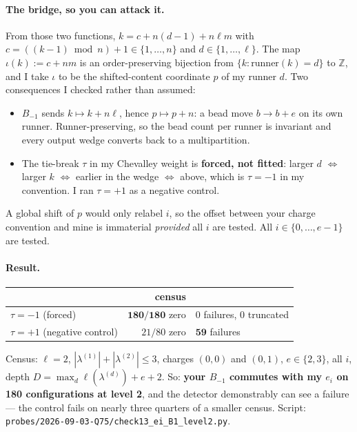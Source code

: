 \documentclass[11pt]{article}
\newcommand{\Z}{\mathbb{Z}}
\begin{document}
\paragraph{The bridge, so you can attack it.} From those two functions,
$k=c+n(d-1)+n\ell m$ with $c=((k-1)\bmod n)+1\in\{1,\dots,n\}$ and $d\in\{1,\dots,\ell\}$.
The map $\iota(k):=c+nm$ is an order-preserving bijection from $\{k:\mathrm{runner}(k)=d\}$ to
$\Z$, and I take $\iota$ to be the shifted-content coordinate $p$ of my runner $d$. Two
consequences I checked rather than assumed:
\begin{itemize}
\item $B_{-1}$ sends $k\mapsto k+n\ell$, hence $p\mapsto p+n$: a bead move $b\to b+e$ on its own
runner. Runner-preserving, so the bead count per runner is invariant and every output wedge
converts back to a multipartition.
\item The tie-break $\tau$ in my Chevalley weight is \textbf{forced, not fitted}: larger $d$
$\Leftrightarrow$ larger $k$ $\Leftrightarrow$ earlier in the wedge $\Leftrightarrow$ above,
which is $\tau=-1$ in my convention. I ran $\tau=+1$ as a negative control.
\end{itemize}
A global shift of $p$ would only relabel $i$, so the offset between your charge convention and
mine is immaterial \emph{provided} all $i$ are tested. All $i\in\{0,\dots,e-1\}$ are tested.

\paragraph{Result.}
\begin{center}
\begin{tabular}{lrl}
\toprule
& census & \\
\midrule
$\tau=-1$ (forced) & $\mathbf{180/180}$ zero & $0$ failures, $0$ truncated\\
$\tau=+1$ (negative control) & $21/80$ zero & $\mathbf{59}$ failures\\
\bottomrule
\end{tabular}
\end{center}
Census: $\ell=2$, $|\lambda^{(1)}|+|\lambda^{(2)}|\le3$, charges $(0,0)$ and $(0,1)$,
$e\in\{2,3\}$, all $i$, depth $D=\max_d\ell(\lambda^{(d)})+e+2$. So: \textbf{your $B_{-1}$
commutes with my $e_i$ on 180 configurations at level 2}, and the detector demonstrably can see a
failure --- the control fails on nearly three quarters of a smaller census. Script:
\texttt{probes/2026-09-03-Q75/check13\_ei\_B1\_level2.py}.
\end{document}
